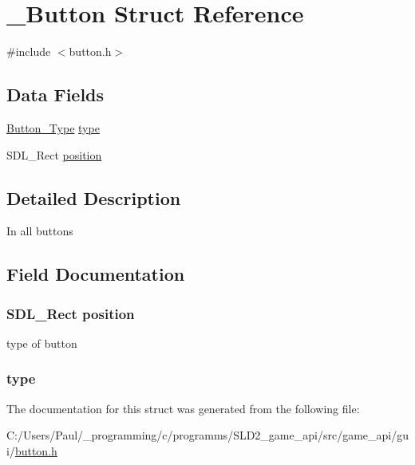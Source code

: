 \hypertarget{struct___button}{\section{\+\_\+\+Button Struct Reference}
\label{struct___button}
}


{\ttfamily \#include $<$button.\+h$>$}

\subsection*{Data Fields}
\begin{DoxyCompactItemize}
\item 
\hyperlink{button_8h_a243b6358d763e8f2d749b1e3b3dcdf84}{Button\+\_\+\+Type} \hyperlink{struct___button_add357a13bd005a199cb60dfdb83401b7}{type}
\item 
S\+D\+L\+\_\+\+Rect \hyperlink{struct___button_ac06cf6a292dc0e70e28b394fa481aef2}{position}
\end{DoxyCompactItemize}


\subsection{Detailed Description}
In all buttons 

\subsection{Field Documentation}
\hypertarget{struct___button_ac06cf6a292dc0e70e28b394fa481aef2}{
\subsubsection[{position}]{\setlength{\rightskip}{0pt plus 5cm}S\+D\+L\+\_\+\+Rect position}}\label{struct___button_ac06cf6a292dc0e70e28b394fa481aef2}
type of button \hypertarget{struct___button_add357a13bd005a199cb60dfdb83401b7}{
\subsubsection[{type}]{ type}}\label{struct___button_add357a13bd005a199cb60dfdb83401b7}


The documentation for this struct was generated from the following file\+:\begin{DoxyCompactItemize}
\item 
C\+:/\+Users/\+Paul/\+\_\+programming/c/programms/\+S\+L\+D2\+\_\+game\+\_\+api/src/game\+\_\+api/gui/\hyperlink{button_8h}{button.\+h}\end{DoxyCompactItemize}
